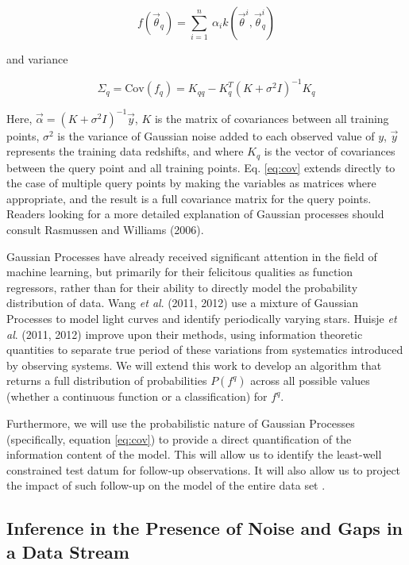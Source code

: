 \documentclass[useAMS,usenatbib,tightenlines,11pt,preprint]{aastex}
\begin{document}
\begin{equation}
f(\vec{\theta}_{q}) = \sum_{i=1}^n \
\alpha_i k(\vec{\theta}^{i},\vec{\theta}_{q}^{i})
\label{eq:mean}
\end{equation}

\noindent
and variance

\begin{equation}
\Sigma_{q} = \text{Cov}(f_{q}) = K_{qq} - K_q^T (K + \sigma^2I)^{-1} K_q
\label{eq:cov}
\end{equation}

\noindent
Here, $\vec{\alpha} = (K + \sigma^2 I)^{-1}\vec{y}$, $K$ is the matrix of
covariances between all training points, $\sigma^2$ is the variance of
Gaussian noise added to each observed value of $y$, $\vec{y}$
represents the training data redshifts, and
where $K_q$ is the vector of covariances between the query point and all
training points.  Eq. \ref{eq:cov} extends directly to the case of multiple
query points by making the variables as matrices where appropriate, and the
result is a full covariance matrix for the query points.  Readers looking
for a more detailed explanation of Gaussian processes should consult
Rasmussen and Williams (2006).

Gaussian Processes have already received significant attention in the field of
machine learning, but primarily for their felicitous qualities as function
regressors, rather than for their ability to directly model the probability
distribution of data.  Wang {\it et al}. (2011, 2012) use a mixture of Gaussian
Processes to model light curves and identify periodically varying stars.  Huisje
{\it et al}. (2011, 2012) improve upon their methods, using information
theoretic quantities to separate true period of these variations from
systematics introduced by observing systems.  We will extend this work
to develop an algorithm that returns a full distribution of probabilities
$P(f^q)$ across all possible values (whether a continuous function or a
classification) for $f^q$.

Furthermore, we will use the probabilistic nature of Gaussian Processes 
(specifically, equation \ref{eq:cov}) to provide a direct
quantification of the information content of the model.  This will
allow us to
identify the least-well constrained test datum for follow-up observations.  It
will also allow 
us to project the impact of such follow-up on the model of the entire 
data set \cite{Garnett11,Garnett12}.


\subsection{Inference in the Presence of Noise and Gaps in a Data
  Stream}
\end{document}
